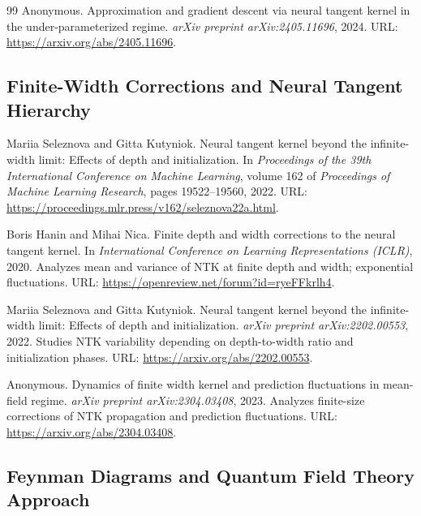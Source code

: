 \documentclass[a4paper]{article}
\theoremstyle{plain}
\theoremstyle{definition}
\theoremstyle{remark}
\begin{document}
\begin{thebibliography}{99}
\label{ref:ntk2024underparam}
Anonymous.
Approximation and gradient descent via neural tangent kernel in the under-parameterized regime.
\textit{arXiv preprint arXiv:2405.11696}, 2024.
URL: \href{https://arxiv.org/abs/2405.11696}{\url{https://arxiv.org/abs/2405.11696}}.

\subsection*{Finite-Width Corrections and Neural Tangent Hierarchy}

\label{ref:seleznova2022ntk_beyond}
Mariia Seleznova and Gitta Kutyniok.
Neural tangent kernel beyond the infinite-width limit: Effects of depth and initialization.
In \textit{Proceedings of the 39th International Conference on Machine Learning},
volume 162 of \textit{Proceedings of Machine Learning Research}, pages 19522--19560, 2022.
URL: \url{https://proceedings.mlr.press/v162/seleznova22a.html}.

\label{ref:hanin_nica_2019}
Boris Hanin and Mihai Nica.
Finite depth and width corrections to the neural tangent kernel.
In \textit{International Conference on Learning Representations (ICLR)}, 2020.
Analyzes mean and variance of NTK at finite depth and width; exponential fluctuations.
URL: \url{https://openreview.net/forum?id=ryeFFkrlh4}.

\label{ref:seleznova_kutyniok_2022}
Mariia Seleznova and Gitta Kutyniok.
Neural tangent kernel beyond the infinite-width limit: Effects of depth and initialization.
\textit{arXiv preprint arXiv:2202.00553}, 2022.
Studies NTK variability depending on depth-to-width ratio and initialization phases.
URL: \href{https://arxiv.org/abs/2202.00553}{\url{https://arxiv.org/abs/2202.00553}}.

\label{ref:anonymous_finite_width_kernel_dynamics_2023}
Anonymous.
Dynamics of finite width kernel and prediction fluctuations in mean-field regime.
\textit{arXiv preprint arXiv:2304.03408}, 2023.
Analyzes finite-size corrections of NTK propagation and prediction fluctuations.
URL: \href{https://arxiv.org/abs/2304.03408}{\url{https://arxiv.org/abs/2304.03408}}.

\subsection*{Feynman Diagrams and Quantum Field Theory Approach}


\end{thebibliography}
\end{document}
